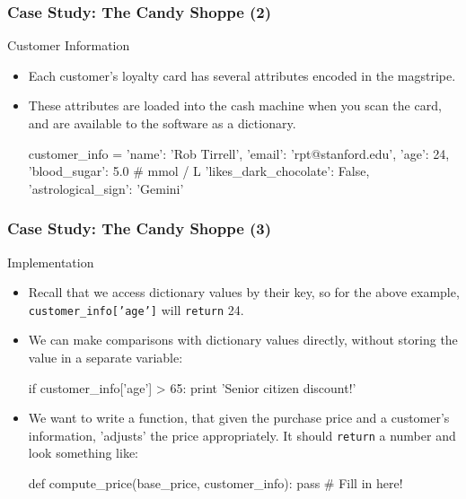 \documentclass[10pt]{beamer}
\begin{document}
\begin{frame}[fragile]
  \frametitle{Case Study: The Candy Shoppe (2)}
  \begin{block}{Customer Information}
    \begin{itemize}
      \item Each customer's loyalty card has several attributes encoded in the magstripe.
      \item These attributes are loaded into the cash machine when you scan the card, and are available to the software as a dictionary.
        \begin{pythoncode}
  customer_info = {
    'name': 'Rob Tirrell',
    'email': 'rpt@stanford.edu',
    'age': 24,
    'blood_sugar': 5.0 # mmol / L
    'likes_dark_chocolate': False,
    'astrological_sign': 'Gemini'
  }
        \end{pythoncode}
    \end{itemize}
  \end{block}
\end{frame}

\begin{frame}[fragile]
  \frametitle{Case Study: The Candy Shoppe (3)}
  \begin{block}{Implementation}
    \begin{itemize}
      \item Recall that we access dictionary values by their key, so for the above example, \texttt{customer\_info['age']} will \texttt{return} 24.
      \item We can make comparisons with dictionary values directly, without storing the value in a separate variable:
        \begin{pythoncode}
  if customer_info['age'] > 65:
    print 'Senior citizen discount!'
        \end{pythoncode}
      \item We want to write a function, that given the purchase price and a customer's information, 'adjusts' the price appropriately.
        It should \texttt{return} a number and look something like:
        \begin{pythoncode}
  def compute_price(base_price, customer_info):
    pass # Fill in here!
        \end{pythoncode}
    \end{itemize}
  \end{block}
\end{frame}
\end{document}
